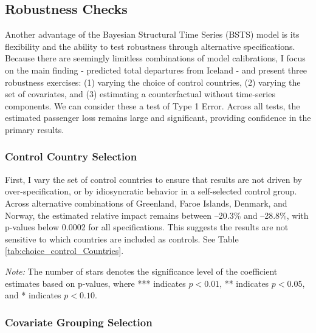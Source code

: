 \documentclass[12pt]{article}
\begin{document}
\subsection{Robustness Checks}\label{sec:Robustness}
Another advantage of the Bayesian Structural Time Series (BSTS) model is its flexibility and the ability to test robustness through alternative specifications. Because there are seemingly limitless combinations of model calibrations, I focus on the main finding - predicted total departures from Iceland - and present three robustness exercises: (1) varying the choice of control countries, (2) varying the set of covariates, and (3) estimating a counterfactual without time-series components. We can consider these a test of Type 1 Error. Across all tests, the estimated passenger loss remains large and significant, providing confidence in the primary results.  

\subsubsection{Control Country Selection}\label{sec:robustness1}
First, I vary the set of control countries to ensure that results are not driven by over-specification, or by idiosyncratic behavior in a self-selected control group. Across alternative combinations of Greenland, Faroe Islands, Denmark, and Norway, the estimated relative impact remains between –20.3\% and –28.8\%, with p-values below 0.0002 for all specifications. This suggests the results are not sensitive to which countries are included as controls. See Table \ref{tab:choice_control_Countries}. 


\begin{table}
\caption{Choice of Control Countries}
\label{tab:choice_control_Countries}
\centering
  \resizebox{\textwidth}{!}{%
  
}
  \begin{tablenotes}
    \footnotesize
    \item \textit{Note:} The number of stars denotes the significance level of the coefficient estimates based on p-values, where *** indicates $p<0.01$, ** indicates $p<0.05$, and * indicates $p<0.10$.
  \end{tablenotes}
\end{table}


\subsubsection{Covariate Grouping Selection}\label{sec:robustness2}
\end{document}

